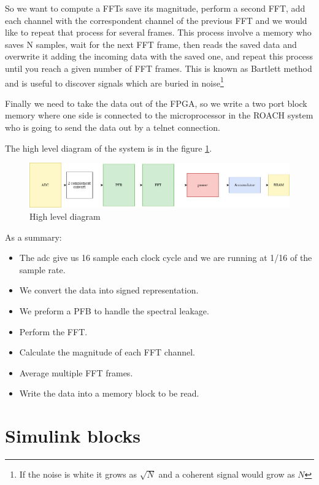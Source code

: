 So we want to compute a FFTs save its magnitude, perform a second FFT, add  each channel with the correspondent channel of the previous FFT and we would like to repeat that process for several frames.
This process involve a memory who saves N samples, wait for the next FFT frame, then reads the saved data and overwrite it adding the incoming data with the saved one, and repeat this process until you reach a given number of FFT frames.
This is known as Bartlett method and is useful to discover signals which are buried in noise\footnote{If the noise is white it grows as $\sqrt{N}$ and a coherent signal would grow as $N$}


Finally we need to take the data out of the FPGA, so we write a two port block memory where one side is connected to the microprocessor in the ROACH system who is going to send the data out by a telnet connection. 


The high level diagram of the system is in the figure \ref{fig:diagram}.

\begin{figure}
    \centering
    \includegraphics[scale=0.3]{images/diagram.png}
    \caption{High level diagram}
    \label{fig:diagram}
\end{figure}

As a summary:
\begin{itemize}
    \item The adc give us 16 sample each clock cycle and we are running at 1/16 of the sample rate.
    \item We convert the data into signed representation.
    \item We preform a PFB to handle the spectral leakage.
    \item Perform the FFT.
    \item Calculate the magnitude of each FFT channel.
    \item Average multiple FFT frames.
    \item Write the data into a memory block to be read.
\end{itemize}

\section{Simulink blocks}

